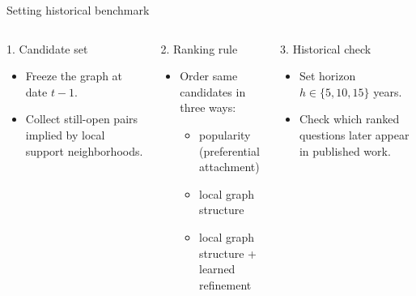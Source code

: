 \documentclass[aspectratio=169,10pt]{beamer}
\begin{document}
\begin{frame}{Setting historical benchmark}
\centering
\vspace{0.2em}
\begin{columns}[T,totalwidth=0.95\textwidth]
\begin{block}{1. Candidate set}
\begin{itemize}
  \item Freeze the graph at date \(t-1\).
  \item Collect still-open pairs implied by local support neighborhoods.
\end{itemize}
\end{block}

\begin{block}{2. Ranking rule}
\begin{itemize}
  \item Order same candidates in three ways:
  \begin{itemize}
    \item popularity (preferential attachment)
    \item local graph structure
    \item local graph structure + learned refinement
  \end{itemize}
\end{itemize}
\end{block}

\begin{block}{3. Historical check}
\begin{itemize}
  \item Set horizon \(h \in \{5,10,15\}\) years.
  \item Check which ranked questions later appear in published work.
\end{itemize}
\end{block}
\end{columns}
\end{frame}
\end{document}
